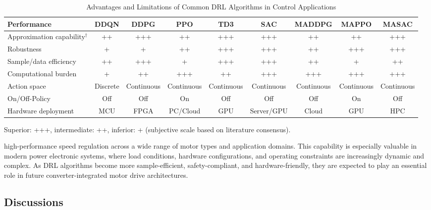 \begin{table}[t]
\centering
\caption{Advantages and Limitations of Common DRL Algorithms in Control Applications}
\label{tab:DRLcomparison}
\renewcommand{\arraystretch}{1.2}
\begin{tabular}{l|cccccccc}
\hline
\textbf{Performance}               & \textbf{DDQN} & \textbf{DDPG} & \textbf{PPO} & \textbf{TD3} & \textbf{SAC} & \textbf{MADDPG} & \textbf{MAPPO} & \textbf{MASAC} \\
\hline
Approximation capability$^\dag$   & ++  & +++   & ++    & +++   & +++   & ++   & ++   & +++ \\
Robustness                        & +   & +     & ++    & +++   & +++   & ++    & +++    & +++ \\
Sample/data efficiency            & ++  & +++   & +    & +++    & +++   & ++    & +   & ++ \\
Computational burden              & +   & ++    & +++   & ++    & +++   & +++   & +++   & +++ \\
Action space                      & Discrete & Continuous & Continuous & Continuous & Continuous & Continuous & Continuous & Continuous \\ 
On/Off-Policy                     & Off & Off & On & Off & Off & Off & On & Off \\ 
Hardware deployment               & MCU & FPGA & PC/Cloud & GPU & Server/GPU & Cloud & GPU & HPC \\      
\hline
\end{tabular}
\vspace{2mm}
\vspace{1mm}
\begin{tablenotes}
\small
\item Superior: +++, intermediate: ++, inferior: + (subjective scale based on literature consensus).
\end{tablenotes}
\end{table}
high-performance speed regulation across a wide range of motor types and application domains. This capability is especially valuable in modern power electronic systems, where load conditions, hardware configurations, and operating constraints are increasingly dynamic and complex. As DRL algorithms become more sample-efficient, safety-compliant, and hardware-friendly, they are expected to play an essential role in future converter-integrated motor drive architectures.

\subsection{Discussions}
\label{sec:ctrl_discuss}

